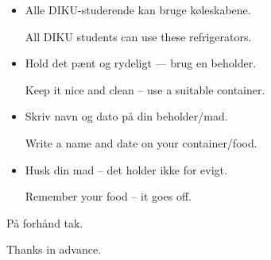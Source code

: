 \documentclass{article}
\begin{document}
\maketitle

\null
\vspace{-1cm}


\huge

\dansk

\begin{itemize}

\item Alle DIKU-studerende kan bruge køleskabene.

\english All DIKU students can use these refrigerators.

\dansk \item Hold det pænt og rydeligt --- brug en beholder.

\english Keep it nice and clean -- use a suitable container.

\dansk \item Skriv navn og dato på din beholder/mad.

\english Write a name and date on your container/food.

\dansk \item Husk din mad -- det holder ikke for evigt.

\english Remember your food -- it goes off.

\end{itemize}

\vspace{0.5cm}

\begin{center}

\huge

På forhånd tak. \\

\english

Thanks in advance.

\vspace{-1cm}

\end{center}

\underskriv
\end{document}
